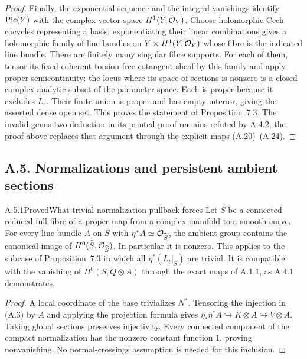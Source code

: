 \begin{proof}
Finally, the exponential sequence and the integral vanishings identify $\operatorname{Pic}(Y)$ with the complex vector space $H^1(Y,\mathcal O_Y)$. Choose holomorphic Cech cocycles representing a basis; exponentiating their linear combinations gives a holomorphic family of line bundles on $Y\times H^1(Y,\mathcal O_Y)$ whose fibre is the indicated line bundle. There are finitely many singular fibre supports. For each of them, tensor its fixed coherent torsion-free cotangent sheaf by this family and apply proper semicontinuity: the locus where its space of sections is nonzero is a closed complex analytic subset of the parameter space. Each is proper because it excludes $L_r$. Their finite union is proper and has empty interior, giving the asserted dense open set. This proves the statement of Proposition~7.3. The invalid genus-two deduction in its printed proof remains refuted by A.4.2; the proof above replaces that argument through the explicit maps (A.20)--(A.24).
\end{proof}


\subsection{A.5. Normalizations and persistent ambient sections}


\begin{statement}{A.5.1}{Proved}{What trivial normalization pullback forces}
Let $S$ be a connected reduced full fibre of a proper map from a complex manifold to a smooth curve. For every line bundle $A$ on $S$ with $\eta^*A\simeq\mathcal O_{\widetilde S}$, the ambient group contains the canonical image of $H^0(\widetilde S,\mathcal O_{\widetilde S})$. In particular it is nonzero. This applies to the subcase of Proposition~7.3 in which all $\eta^*(L_t|_S)$ are trivial. It is compatible with the vanishing of $H^0(S,Q\otimes A)$ through the exact maps of A.1.1, as A.4.1 demonstrates.
\end{statement}
\begin{proof}
A local coordinate of the base trivializes $N^*$. Tensoring the injection in (A.3) by $A$ and applying the projection formula gives
$\eta_*\eta^*A\hookrightarrow K\otimes A\hookrightarrow V\otimes A$.
Taking global sections preserves injectivity. Every connected component of the compact normalization has the nonzero constant function $1$, proving nonvanishing. No normal-crossings assumption is needed for this inclusion.
\end{proof}

